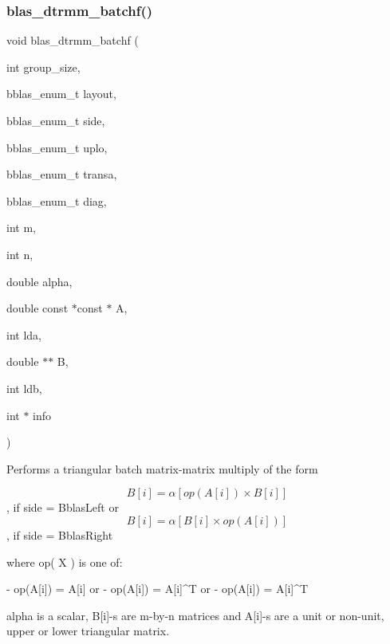 \subsubsection{\texorpdfstring{blas\+\_\+dtrmm\+\_\+batchf()}{blas\_dtrmm\_batchf()}}
{\footnotesize\ttfamily void blas\+\_\+dtrmm\+\_\+batchf (\begin{DoxyParamCaption}\item[{int}]{group\+\_\+size,  }\item[{bblas\+\_\+enum\+\_\+t}]{layout,  }\item[{bblas\+\_\+enum\+\_\+t}]{side,  }\item[{bblas\+\_\+enum\+\_\+t}]{uplo,  }\item[{bblas\+\_\+enum\+\_\+t}]{transa,  }\item[{bblas\+\_\+enum\+\_\+t}]{diag,  }\item[{int}]{m,  }\item[{int}]{n,  }\item[{double}]{alpha,  }\item[{double const $\ast$const $\ast$}]{A,  }\item[{int}]{lda,  }\item[{double $\ast$$\ast$}]{B,  }\item[{int}]{ldb,  }\item[{int $\ast$}]{info }\end{DoxyParamCaption})}

Performs a triangular batch matrix-\/matrix multiply of the form

\[B[i] = \alpha [op( A[i] ) \times B[i]] \], if side = Bblas\+Left or \[B[i] = \alpha [B[i] \times op( A[i]) ] \], if side = Bblas\+Right

where op( X ) is one of\+: \begin{DoxyVerb}    - op(A[i]) = A[i]   or
    - op(A[i]) = A[i]^T or
    - op(A[i]) = A[i]^T
\end{DoxyVerb}


alpha is a scalar, B\mbox{[}i\mbox{]}-\/s are m-\/by-\/n matrices and A\mbox{[}i\mbox{]}-\/s are a unit or non-\/unit, upper or lower triangular matrix.


